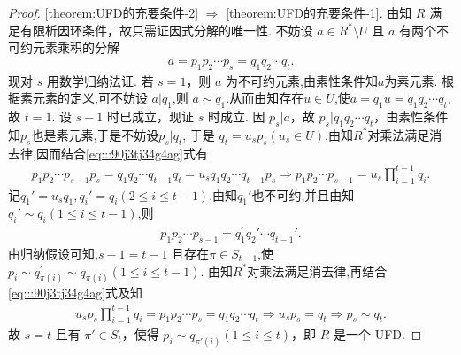 \documentclass[../../main.tex]{subfiles}%
\begin{document}
\begin{proof}
\ref{theorem:UFD的充要条件-2} \( \Rightarrow \) \ref{theorem:UFD的充要条件-1}. 由知 \( R \) 满足有限析因环条件，故只需证因式分解的唯一性. 不妨设 \( a \in R^* \setminus U \) 且 \( a \) 有两个不可约元素乘积的分解
\begin{align}\label{eq:::90j3tj34g4ag}
a = p_1p_2\cdots p_s = q_1q_2\cdots q_t.
\end{align}
现对 \( s \) 用数学归纳法证. 若 \( s = 1 \)，则 \( a \) 为不可约元素,由素性条件知$a$为素元素. 根据素元素的定义,可不妨设 \( a|q_1 \),则 \( a \sim q_1 \).从而由知存在$u\in U$,使$a=q_1u=q_1q_2\cdots q_t$,故 \( t = 1 \). 设 \( s - 1 \) 时已成立，现证 \( s \) 时成立. 因 \( p_s|a \)，故 \( p_s|q_1q_2\cdots q_t \)，由素性条件知$p_s$也是素元素,于是不妨设\( p_s|q_{t} \), 于是 \( q_{t} = u_sp_s(u_s \in U) \).由知$R^*$对乘法满足消去律,因而结合\eqref{eq:::90j3tj34g4ag}式有
\begin{align*}
p_1p_2\cdots p_{s-1}p_s=q_1q_2\cdots q_{t-1}q_t=u_sq_1q_2\cdots q_{t-1}p_s\Longrightarrow p_1p_2\cdots p_{s-1}=u_s\prod_{i=1}^{t-1}{q_i}.
\end{align*}
记$q_1'=u_sq_1,q_i'=q_i(2\leqslant i\leqslant t-1)$,由知$q_1'$也不可约,并且由知$q_i'\sim q_i(1\leqslant i\leqslant t-1)$,则
\begin{align*}
p_1p_2\cdots p_{s-1}=q_{1}^{\prime}q_2'\cdots q_{t-1}'.
\end{align*}
由归纳假设可知,\( s - 1 = t - 1 \) 且存在$\pi \in S_{t-1}$,使  \(p_i\sim q_{\pi \left( i \right)}^{\prime}\sim q_{\pi (i)}(1\leqslant i\leqslant t-1)\).
由知$R^*$对乘法满足消去律,再结合\eqref{eq:::90j3tj34g4ag}式及知
\begin{align*}
u_sp_s\prod_{i=1}^{t-1}{q_i}=p_1p_2\cdots p_s=q_1q_2\cdots q_t\Longrightarrow u_sp_s=q_t\Longrightarrow p_s\sim q_t.
\end{align*}
故 \( s = t \) 且有 \( \pi' \in S_t \)，使得 \( p_i \sim q_{\pi'
(i)}(1 \leqslant i \leqslant t) \)，即 \( R \) 是一个 UFD.

\end{proof}
\end{document}
